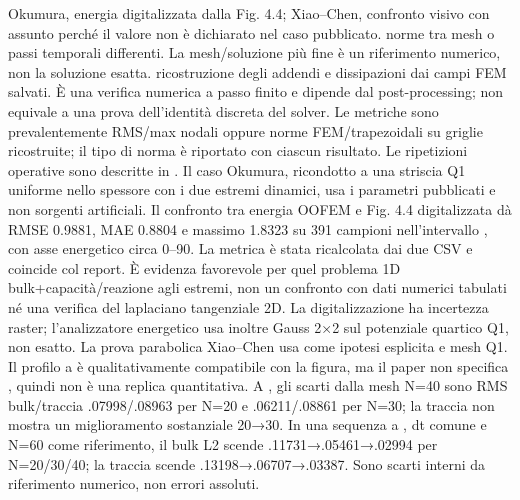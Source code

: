 \markdownRendererUlItem {} Okumura, energia digitalizzata dalla Fig. 4.4; Xiao–Chen, confronto visivo con  assunto perché il valore non è dichiarato nel caso pubblicato.\markdownRendererUlItemEnd 
\markdownRendererUlItem {} norme tra mesh o passi temporali differenti. La mesh/soluzione più fine è un riferimento numerico, non la soluzione esatta.\markdownRendererUlItemEnd 
\markdownRendererUlItem {} ricostruzione degli addendi e dissipazioni dai campi FEM salvati. È una verifica numerica a passo finito e dipende dal post-processing; non equivale a una prova dell’identità discreta del solver.\markdownRendererUlItemEnd 
\markdownRendererUlEndTight \markdownRendererInterblockSeparator
{}Le metriche sono prevalentemente RMS/max nodali oppure norme FEM/trapezoidali su griglie ricostruite; il tipo di norma è riportato con ciascun risultato. Le ripetizioni operative sono descritte in .\markdownRendererInterblockSeparator
{}
\markdownRendererSectionEnd \markdownRendererSectionBegin
{}\markdownRendererInterblockSeparator
{} Il caso Okumura, ricondotto a una striscia Q1 uniforme nello spessore con i due estremi dinamici, usa i parametri pubblicati e non sorgenti artificiali. Il confronto tra energia OOFEM e Fig. 4.4 digitalizzata dà RMSE 0.9881, MAE 0.8804 e massimo 1.8323 su 391 campioni nell’intervallo , con asse energetico circa 0–90. La metrica è stata ricalcolata dai due CSV e coincide col report. È evidenza favorevole per quel problema 1D bulk+capacità/reazione agli estremi, non un confronto con dati numerici tabulati né una verifica del laplaciano tangenziale 2D. La digitalizzazione ha incertezza raster; l’analizzatore energetico usa inoltre Gauss 2×2 sul potenziale quartico Q1, non esatto.\markdownRendererInterblockSeparator
{} La prova parabolica Xiao–Chen usa  come ipotesi esplicita e mesh Q1. Il profilo a  è qualitativamente compatibile con la figura, ma il paper non specifica \markdownRendererInlineMath{\varepsilon}, quindi non è una replica quantitativa. A , gli scarti dalla mesh N=40 sono RMS bulk/traccia .07998/.08963 per N=20 e .06211/.08861 per N=30; la traccia non mostra un miglioramento sostanziale 20→30. In una sequenza a , dt comune e N=60 come riferimento, il bulk L2 scende .11731→.05461→.02994 per N=20/30/40; la traccia scende .13198→.06707→.03387. Sono scarti interni da riferimento numerico, non errori assoluti.\markdownRendererInterblockSeparator
